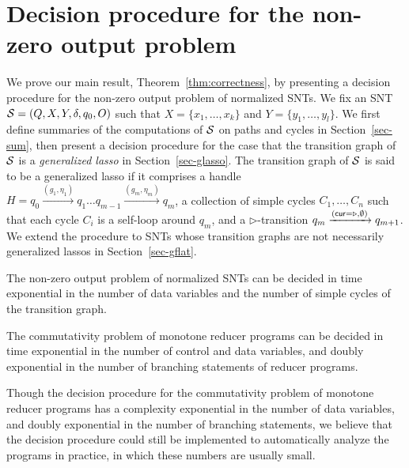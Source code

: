 
\section{Decision procedure for the non-zero output problem}\label{sec:dec-snt}
%
We prove our main result, Theorem~\ref{thm:correctness}, by presenting a decision procedure for the non-zero output problem of normalized SNTs. We fix an SNT ${\mathcal{S} } = (Q,X,Y,\delta,q_0,O)$ such that $X=\{ x_1,\dots, x_k\}$ and $Y = \{y_1,\dots,y_l\}$. 
We first define summaries of the computations of ${\mathcal{S} }$ on paths and cycles in Section~\ref{sec-sum}, then present a decision procedure for the case that the transition graph of ${\mathcal{S} }$ is a \emph{generalized lasso} in Section~\ref{sec-glasso}. The transition graph of ${\mathcal{S} }$ is said to be a generalized lasso if it comprises a handle $H=q_0 \xrightarrow{(g_1,\eta_1)} q_1 \dots q_{m-1} \xrightarrow{(g_m,\eta_m)} q_{m}$, a collection of simple cycles $C_1,\dots,C_n$ such that each cycle $C_i$ is a self-loop around $q_m$, and a $\triangleright$-transition $q_m \xrightarrow{(\mathsf{cur} = \triangleright, \emptyset)} q_{m+1}$. We extend the procedure to SNTs whose transition graphs are not necessarily generalized lassos in Section~\ref{sec-gflat}. 


\begin{theorem}\label{thm:correctness}
The non-zero output problem of normalized SNTs can be decided in time exponential in the number of data variables and the number of simple cycles of the transition graph.
\end{theorem}

\begin{corollary}\label{cor:snt-dec-proc}
The commutativity problem of  monotone reducer programs can be decided in time exponential in the number of control and data variables, and doubly exponential in the number of branching statements of reducer programs. 
\end{corollary}

\begin{remark}
Though the decision procedure for the commutativity problem of monotone reducer programs has a complexity exponential in the number of data variables, and doubly exponential in the number of branching statements, we believe that the decision procedure could still be implemented to automatically analyze the programs in practice, in which these numbers are usually small. 
\end{remark}



